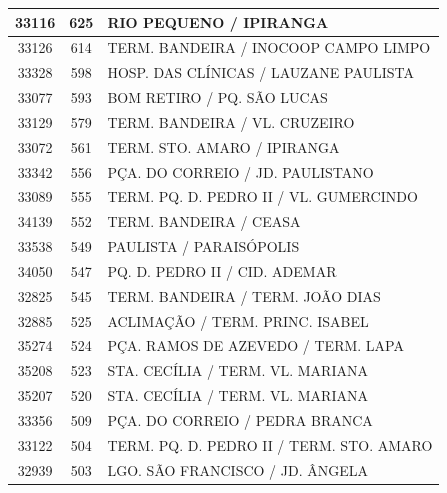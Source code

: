 \documentclass[
	12pt,				%
	oneside,			%
	a4paper,			%
	english,			%
	brazil				%
	]{abntex2ppgsi}
\begin{document}
{{\begin{apendicesenv}
\begin{longtable}{c|c|p{7cm}}
    33116 & 625   & RIO PEQUENO / IPIRANGA \\
\hline

    33126 & 614   & TERM. BANDEIRA / INOCOOP CAMPO LIMPO \\
\hline

    33328 & 598   & HOSP. DAS CLÍNICAS / LAUZANE PAULISTA \\
\hline

    33077 & 593   & BOM RETIRO / PQ. SÃO LUCAS \\
\hline

    33129 & 579   & TERM. BANDEIRA / VL. CRUZEIRO \\
\hline

    33072 & 561   & TERM. STO. AMARO / IPIRANGA \\
\hline

    33342 & 556   & PÇA. DO CORREIO / JD. PAULISTANO \\
\hline

    33089 & 555   & TERM. PQ. D. PEDRO II / VL. GUMERCINDO \\
\hline

    34139 & 552   & TERM. BANDEIRA / CEASA \\
\hline

    33538 & 549   & PAULISTA / PARAISÓPOLIS \\
\hline

    34050 & 547   & PQ. D. PEDRO II / CID. ADEMAR \\
\hline

    32825 & 545   & TERM. BANDEIRA / TERM. JOÃO DIAS \\
\hline

    32885 & 525   & ACLIMAÇÃO / TERM. PRINC. ISABEL \\
\hline

    35274 & 524   & PÇA. RAMOS DE AZEVEDO / TERM. LAPA \\
\hline

    35208 & 523   & STA. CECÍLIA / TERM. VL. MARIANA \\
\hline

    35207 & 520   & STA. CECÍLIA / TERM. VL. MARIANA \\
\hline

    33356 & 509   & PÇA. DO CORREIO / PEDRA BRANCA \\
\hline

    33122 & 504   & TERM. PQ. D. PEDRO II / TERM. STO. AMARO \\
\hline

    32939 & 503   & LGO. SÃO FRANCISCO / JD. ÂNGELA \\
\hline


\end{longtable}
\end{apendicesenv}}}
\end{document}
